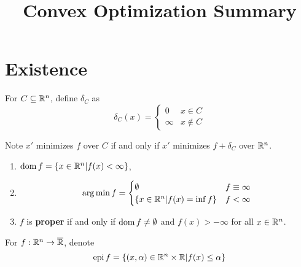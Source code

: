 

\title{Convex Optimization Summary}



\maketitle

\section{Existence}
\label{sec:existence}

\begin{defn}
  \label{sec:existence-1}
  For $C \subseteq \mathbb{R}^{n}$, define $\delta_{C}$ as
  \begin{equation}
    \label{eq:1} \delta_{C}(x) =
    \begin{cases}
      0 & x \in C \\
      \infty & x \notin C
    \end{cases}
  \end{equation}

  Note $x'$ minimizes $f$ over $C$ if and only if $x'$ minimizes $f +
  \delta_{C}$ over $\mathbb{R}^{n}$.
\end{defn}

\begin{defn}
  \label{sec:existence-2}
  \begin{enumerate}
  \item $\operatorname*{dom} f = \{ x \in \mathbb{R}^{n} | f(x) < \infty \}$,
  \item \begin{equation}
      \operatorname*{arg\,min} f =
      \begin{cases}
        \emptyset & f \equiv \infty \\
        \{ x \in \mathbb{R}^{n} | f(x) = \inf f \} & f < \infty
      \end{cases}
    \end{equation}
  \item $f$ is \textbf{proper} if and only if $\operatorname*{dom} f \neq \emptyset$
    and $f(x) > -\infty$ for all $x \in \mathbb{R}^{n}$.
  \end{enumerate}
\end{defn}

\begin{defn}
  \label{sec:existence-3}
  For $f: \mathbb{R}^{n} \rightarrow \overline {\mathbb{R}}$, denote
  \begin{equation}
    \label{eq:2}
    \operatorname*{epi} f = \{ (x, \alpha) \in \mathbb{R}^{n} \times \mathbb{R} | f(x) \leq \alpha \}
  \end{equation}
\end{defn}

